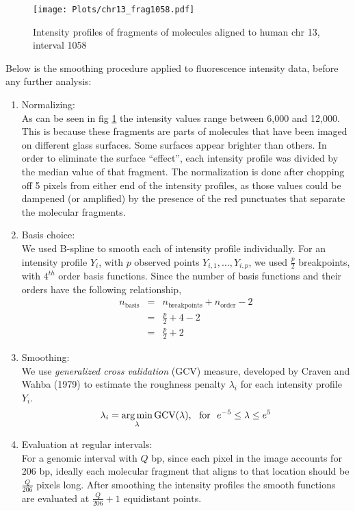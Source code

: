 \begin{figure}[H]
\begin{center}
\texttt{[image: Plots/chr13\_frag1058.pdf]}
\end{center}
\caption{Intensity profiles of fragments of molecules aligned to human chr 13, interval 1058}
\label{fig:Fig3_frag1058_orig}
\end{figure}
Below is the smoothing procedure applied to fluorescence intensity data, before any further analysis:
\begin{enumerate}
\item Normalizing:\\
As can be seen in fig \ref{fig:Fig3_frag1058_orig} the intensity values range between 6,000 and 12,000. This is because these fragments are parts of molecules that have been imaged on different glass surfaces. Some surfaces appear brighter than others. In order to eliminate the surface ``effect'', each intensity profile was divided by the median value of that fragment. The normalization is done after chopping off 5 pixels from either end of the intensity profiles, as those values could be dampened (or amplified) by the presence of the red punctuates that separate the molecular fragments.
\item Basis choice:\\
We used B-spline \cite{deBoor_1978_Splines} to smooth each of intensity profile individually. For an intensity profile $Y_i$, with $p$ observed points $Y_{i,1}, \dots, Y_{i,p}$, we used $\frac{p}{2}$ breakpoints, with $4^{th}$ order basis functions. Since the number of basis functions and their orders have the following relationship, 
\begin{eqnarray*}
n_{\text{basis}} &=& n_{\text{breakpoints}} + n_{\text{order}} - 2 \\
                 &=& \frac{p}{2} + 4 - 2\\ 
                 &=& \frac{p}{2} + 2
\end{eqnarray*}
\item Smoothing:\\
We use {\emph{generalized cross validation}} (GCV) measure, developed by Craven and Wahba (1979) \cite{Craven_Wahba_1978_NumMath} to estimate the roughness penalty $\lambda_{i}$ for each intensity profile $Y_i$.  
\[ \lambda_i = \operatorname*{arg\,min}_{\lambda} \text{GCV}(\lambda), \ \ \text{for\ \ } e^{-5} \leq \lambda \leq e^5 \]

\item Evaluation at regular intervals: \\
For a genomic interval with $Q$ bp, since each pixel in the image accounts for 206 bp, ideally each molecular fragment that aligns to that location should be $\frac{Q}{206}$ pixels long. After smoothing the intensity profiles the smooth functions are evaluated at $\frac{Q}{206} + 1$ equidistant points. 
\end{enumerate}
